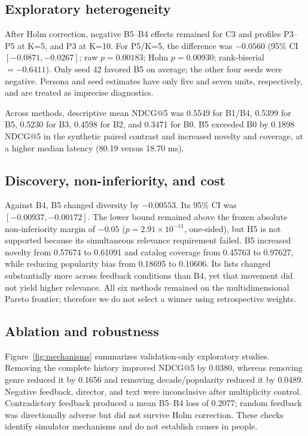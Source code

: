 \documentclass[sigconf,anonymous,review,natbib=false]{acmart}
\begin{document}
\subsection{Exploratory heterogeneity}

After Holm correction, negative B5--B4 effects remained for C3 and profiles
P3--P5 at K=5, and P3 at K=10. For P5/K=5, the difference was $-0.0560$
(95\% CI $[-0.0871,-0.0267]$; raw $p=0.00183$; Holm $p=0.00930$;
rank-biserial $=-0.6411$). Only seed 42 favored B5 on average; the other four
seeds were negative. Persona and seed estimates have only five and seven units,
respectively, and are treated as imprecise diagnostics.

Across methods, descriptive mean NDCG@5 was 0.5549 for B1/B4, 0.5399 for B5,
0.5230 for B3, 0.4598 for B2, and 0.3471 for B0. B5 exceeded B0 by 0.1898 NDCG@5 in the synthetic paired contrast and increased
novelty and coverage, at a higher median latency (80.19 versus 18.70 ms).

\subsection{Discovery, non-inferiority, and cost}

Against B4, B5 changed diversity by $-0.00553$. Its 95\% CI was
$[-0.00937, -0.00172]$. The lower bound remained above the frozen absolute
non-inferiority margin of $-0.05$ ($p=2.91\times10^{-11}$, one-sided), but H5
is not supported because its simultaneous relevance requirement failed. B5
increased novelty from 0.57674 to 0.61091 and catalog coverage from 0.45763 to
0.97627, while reducing popularity bias from 0.18695 to 0.10606. Its lists
changed substantially more across feedback conditions than B4, yet that
movement did not yield higher relevance. All six methods remained on the
multidimensional Pareto frontier; therefore we do not select a winner using
retrospective weights.

\subsection{Ablation and robustness}

Figure~\ref{fig:mechanisms} summarizes validation-only exploratory studies.
Removing the complete history improved NDCG@5 by 0.0380, whereas removing genre
reduced it by 0.1656 and removing decade/popularity reduced it by 0.0489.
Negative feedback, director, and text were inconclusive after multiplicity
control. Contradictory feedback produced a mean B5--B4 loss of 0.2077; random
feedback was directionally adverse but did not survive Holm correction. These
checks identify simulator mechanisms and do not establish causes in people.
\end{document}
